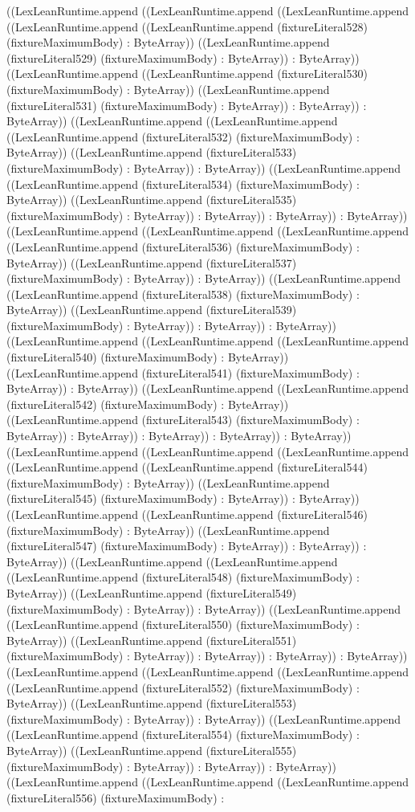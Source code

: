 \documentclass[11pt]{article}
\begin{document}
((LexLeanRuntime.append ((LexLeanRuntime.append ((LexLeanRuntime.append ((LexLeanRuntime.append ((LexLeanRuntime.append (fixtureLiteral528) (fixtureMaximumBody) : ByteArray)) ((LexLeanRuntime.append (fixtureLiteral529) (fixtureMaximumBody) : ByteArray)) : ByteArray)) ((LexLeanRuntime.append ((LexLeanRuntime.append (fixtureLiteral530) (fixtureMaximumBody) : ByteArray)) ((LexLeanRuntime.append (fixtureLiteral531) (fixtureMaximumBody) : ByteArray)) : ByteArray)) : ByteArray)) ((LexLeanRuntime.append ((LexLeanRuntime.append ((LexLeanRuntime.append (fixtureLiteral532) (fixtureMaximumBody) : ByteArray)) ((LexLeanRuntime.append (fixtureLiteral533) (fixtureMaximumBody) : ByteArray)) : ByteArray)) ((LexLeanRuntime.append ((LexLeanRuntime.append (fixtureLiteral534) (fixtureMaximumBody) : ByteArray)) ((LexLeanRuntime.append (fixtureLiteral535) (fixtureMaximumBody) : ByteArray)) : ByteArray)) : ByteArray)) : ByteArray)) ((LexLeanRuntime.append ((LexLeanRuntime.append ((LexLeanRuntime.append ((LexLeanRuntime.append (fixtureLiteral536) (fixtureMaximumBody) : ByteArray)) ((LexLeanRuntime.append (fixtureLiteral537) (fixtureMaximumBody) : ByteArray)) : ByteArray)) ((LexLeanRuntime.append ((LexLeanRuntime.append (fixtureLiteral538) (fixtureMaximumBody) : ByteArray)) ((LexLeanRuntime.append (fixtureLiteral539) (fixtureMaximumBody) : ByteArray)) : ByteArray)) : ByteArray)) ((LexLeanRuntime.append ((LexLeanRuntime.append ((LexLeanRuntime.append (fixtureLiteral540) (fixtureMaximumBody) : ByteArray)) ((LexLeanRuntime.append (fixtureLiteral541) (fixtureMaximumBody) : ByteArray)) : ByteArray)) ((LexLeanRuntime.append ((LexLeanRuntime.append (fixtureLiteral542) (fixtureMaximumBody) : ByteArray)) ((LexLeanRuntime.append (fixtureLiteral543) (fixtureMaximumBody) : ByteArray)) : ByteArray)) : ByteArray)) : ByteArray)) : ByteArray)) ((LexLeanRuntime.append ((LexLeanRuntime.append ((LexLeanRuntime.append ((LexLeanRuntime.append ((LexLeanRuntime.append (fixtureLiteral544) (fixtureMaximumBody) : ByteArray)) ((LexLeanRuntime.append (fixtureLiteral545) (fixtureMaximumBody) : ByteArray)) : ByteArray)) ((LexLeanRuntime.append ((LexLeanRuntime.append (fixtureLiteral546) (fixtureMaximumBody) : ByteArray)) ((LexLeanRuntime.append (fixtureLiteral547) (fixtureMaximumBody) : ByteArray)) : ByteArray)) : ByteArray)) ((LexLeanRuntime.append ((LexLeanRuntime.append ((LexLeanRuntime.append (fixtureLiteral548) (fixtureMaximumBody) : ByteArray)) ((LexLeanRuntime.append (fixtureLiteral549) (fixtureMaximumBody) : ByteArray)) : ByteArray)) ((LexLeanRuntime.append ((LexLeanRuntime.append (fixtureLiteral550) (fixtureMaximumBody) : ByteArray)) ((LexLeanRuntime.append (fixtureLiteral551) (fixtureMaximumBody) : ByteArray)) : ByteArray)) : ByteArray)) : ByteArray)) ((LexLeanRuntime.append ((LexLeanRuntime.append ((LexLeanRuntime.append ((LexLeanRuntime.append (fixtureLiteral552) (fixtureMaximumBody) : ByteArray)) ((LexLeanRuntime.append (fixtureLiteral553) (fixtureMaximumBody) : ByteArray)) : ByteArray)) ((LexLeanRuntime.append ((LexLeanRuntime.append (fixtureLiteral554) (fixtureMaximumBody) : ByteArray)) ((LexLeanRuntime.append (fixtureLiteral555) (fixtureMaximumBody) : ByteArray)) : ByteArray)) : ByteArray)) ((LexLeanRuntime.append ((LexLeanRuntime.append ((LexLeanRuntime.append (fixtureLiteral556) (fixtureMaximumBody) : 
\end{document}
